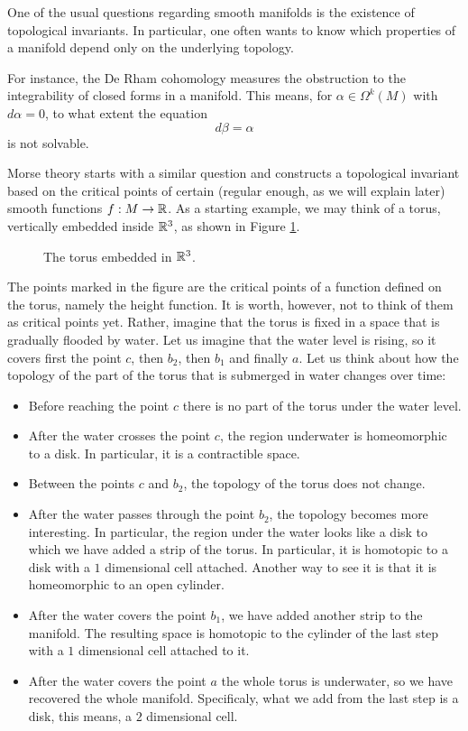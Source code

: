 One of the usual questions regarding smooth manifolds is the existence of topological invariants. In particular, one often wants to know which properties of a manifold depend only on the underlying topology.

For instance, the De Rham cohomology measures the obstruction to the integrability of closed forms in a manifold. This means, for $\alpha \in \Omega^k(M)$ with $d\alpha = 0$, to what extent the equation
\[d\beta = \alpha\]
is not solvable.

Morse theory starts with a similar question and constructs a topological invariant based on the critical points of certain (regular enough, as we will explain later) smooth functions $f : M \rightarrow \mathbb{R}$. As a starting example, we may think of a torus, vertically embedded inside $\mathbb{R}^3$, as shown in Figure \ref{figure:torus}.

\begin{figure}[h]
	\centering
	
	\caption{The torus embedded in $\mathbb{R}^3$.}
	\label{figure:torus}
\end{figure}

The points marked in the figure are the critical points of a function defined on the torus, namely the height function. It is worth, however, not to think of them as critical points yet. Rather, imagine that the torus is fixed in a space that is gradually flooded by water. Let us imagine that the water level is rising, so it covers first the point $c$, then $b_2$, then $b_1$ and finally $a$. Let us think about how the topology of the part of the torus that is submerged in water changes over time:

\begin{itemize}
	\item Before reaching the point $c$ there is no part of the torus under the water level.
	\item After the water crosses the point $c$, the region underwater is homeomorphic to a disk. In particular, it is a contractible space.
	\item Between the points $c$ and $b_2$, the topology of the torus does not change.
	\item After the water passes through the point $b_2$, the topology becomes more interesting. In particular, the region under the water looks like a disk to which we have added a strip of the torus. In particular, it is homotopic to a disk with a $1$ dimensional cell attached. Another way to see it is that it is homeomorphic to an open cylinder.
	\item After the water covers the point $b_1$, we have added another strip to the manifold. The resulting space is homotopic to the cylinder of the last step with a $1$ dimensional cell attached to it.
	\item After the water covers the point $a$ the whole torus is underwater, so we have recovered the whole manifold. Specificaly, what we add from the last step is a disk, this means, a $2$ dimensional cell.
\end{itemize}


